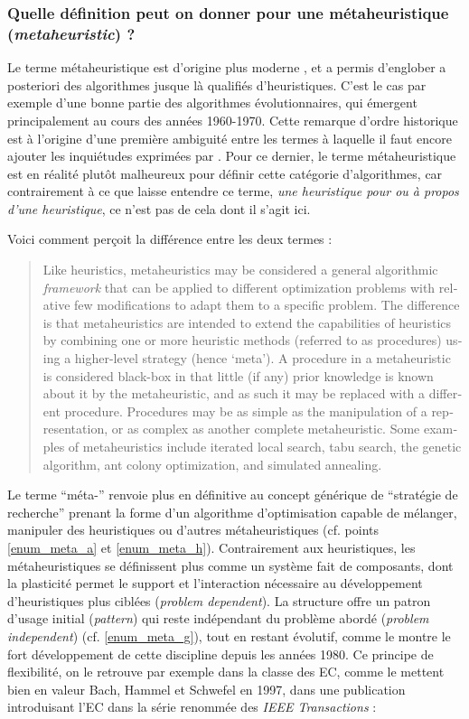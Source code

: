 \subsubsection{Quelle définition peut on donner pour une métaheuristique (\textit{metaheuristic}) ?}
\label{sssec:metaheuristique}

Le terme métaheuristique est d'origine plus moderne \autocite{Glover1986}, et a permis d'englober a posteriori des algorithmes jusque là qualifiés d'heuristiques. C'est le cas par exemple d'une bonne partie des algorithmes évolutionnaires, qui émergent principalement au cours des années 1960-1970. Cette remarque d'ordre historique est à l'origine d'une première ambiguité entre les termes à laquelle il faut encore ajouter les inquiétudes exprimées par \textcite{Luke2013}. Pour ce dernier, le terme métaheuristique est en réalité plutôt malheureux pour définir cette catégorie d'algorithmes, car contrairement à ce que laisse entendre ce terme, \textit{une heuristique pour ou à propos d'une heuristique}, ce n'est pas de cela dont il s'agit ici.

Voici comment \textcite[8]{Brownlee2012} perçoit la différence entre les deux termes : \foreignblockquote{english}[{\cite[8]{Brownlee2012}}]{Like heuristics, metaheuristics may be considered a general algorithmic \textit{framework} that can be applied to different optimization problems with relative few modifications to adapt them to a specific problem. The difference is that metaheuristics are intended to extend the capabilities of heuristics by combining one or more heuristic methods (referred to as procedures) using a higher-level strategy (hence ‘meta’). A procedure in a metaheuristic is considered black-box in that little (if any) prior knowledge is known about it by the metaheuristic, and as such it may be replaced with a different procedure. Procedures may be as simple as the manipulation of a representation, or as complex as another complete metaheuristic. Some examples of metaheuristics include iterated local search, tabu search, the genetic algorithm, ant colony optimization, and simulated annealing.}

Le terme \enquote{méta-} renvoie plus en définitive au concept générique de \enquote{stratégie de recherche} prenant la forme d'un algorithme d'optimisation capable de mélanger, manipuler des heuristiques ou d'autres métaheuristiques (cf. points \ref{enum_meta_a} et \ref{enum_meta_h}). Contrairement aux heuristiques, les métaheuristiques se définissent plus comme un système fait de composants, dont la plasticité permet le support et l'interaction nécessaire au développement d'heuristiques plus ciblées (\textit{problem dependent}). La structure offre un patron d'usage initial (\textit{pattern}) qui reste indépendant du problème abordé (\textit{problem independent}) (cf. \ref{enum_meta_g}), tout en restant évolutif, comme le montre le fort développement de cette discipline depuis les années 1980. Ce principe de flexibilité, on le retrouve par exemple dans la classe des EC, comme le mettent bien en valeur Bach, Hammel et Schwefel en 1997, dans une publication introduisant l'EC dans la série renommée des \textit{IEEE Transactions} :

